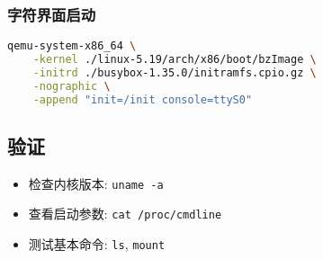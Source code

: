 \subsubsection{字符界面启动}
\begin{lstlisting}[language=bash]
qemu-system-x86_64 \
    -kernel ./linux-5.19/arch/x86/boot/bzImage \
    -initrd ./busybox-1.35.0/initramfs.cpio.gz \
    -nographic \
    -append "init=/init console=ttyS0"
\end{lstlisting}

\subsection{验证}
\begin{itemize}
    \item 检查内核版本: \texttt{uname -a}
    \item 查看启动参数: \texttt{cat /proc/cmdline}
    \item 测试基本命令: \texttt{ls}, \texttt{mount}
\end{itemize}
